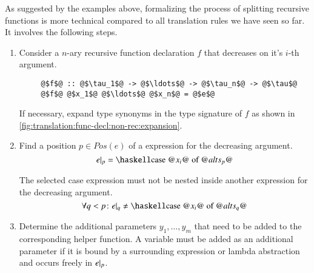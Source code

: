As suggested by the examples above, formalizing the process of splitting recursive functions is more technical compared to all translation rules we have seen so far.
It involves the following steps.

\begin{enumerate}
  \item
  Consider a $n$-ary recursive function declaration $f$ that decreases on it's $i$-th argument.
  \begin{verbatim}
     @$f$@ :: @$\tau_1$@ -> @$\ldots$@ -> @$\tau_n$@ -> @$\tau$@
     @$f$@ @$x_1$@ @$\ldots$@ @$x_n$@ = @$e$@
  \end{verbatim}
  If necessary, expand type synonyms in the type signature of $f$ as shown in \autoref{fig:translation:func-decl:non-rec:expansion}.

  \item
  Find a position $p \in Pos(e)$ of a  expression for the decreasing argument.
  \[
    \subterm{e}{p} = \haskellM{case @$x_i$@ of @$alts_p$@}
  \]

  The selected case expression must not be nested inside another  expression for the decreasing argument.
  \[
    \forall q < p \colon \subterm{e}{q} \ne \haskellM{case @$x_i$@ of @$alts_q$@}
  \]

  \item
  Determine the additional parameters $y_1, \ldots, y_m$ that need to be added to the corresponding helper function.
  A variable must be added as an additional parameter if it is bound by a surrounding  expression or lambda abstraction and occurs freely in ${e}|_{p}$.


\end{enumerate}

